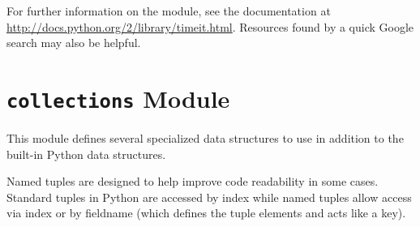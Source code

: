For further information on the  module, see the documentation at \url{http://docs.python.org/2/library/timeit.html}. Resources found by a quick Google search may also be helpful.

\begin{comment}
\begin{problem}
For most timing situations, we rely on IPython's \li{\%timeit} function.
Since this is a special function only available inside IPython, however, we will write a more general timer that works anywhere with any function.
The solution to this problem will be useful in other labs where you will be asked to time the execution of your coded solutions.
Write a function that will time the execution of another function.
Your function should return the minimum runtime for one call of the function.

Because of the way that Python's \li{timeit} module works, we can either evaluate a string of Python code or use a \emph{callable} function with no arguments.
For this problem, we will use the the callable function approach.
This essentially means we have to wrap the function we are timing and all of its arguments into a function object that can be called by \li{timeit}.
This wrapping fixes the arguments of the function so we can call it without any arguments later.
This is done by declaring a Python \li{lambda}, or temporary, anonymous  function, which takes no arguments.  \li{pfunc} is a wrapper function for $f$ because its primary job is to call $f$ with little or no additional computation.
In our program, we use \li{pfunc} only to modify how we call $f$.
\begin{lstlisting}
pfunc = lambda: f(*args, **kwargs)
\end{lstlisting}
where \li{args} is a tuple of arguments and \li{kwargs} is a dictionary of keyword arguments to the function, $f$.
You can refresh your memory of functions and their arguments and keyword arguments in sections 4.7.1-4.7.4 of the official Python tutorial.
\end{problem}
\end{comment}


\section*{\texttt{collections} Module}
This module defines several specialized data structures to use in addition to the built-in Python data structures.

Named tuples are designed to help improve code readability in some cases.
Standard tuples in Python are accessed by index while named tuples allow access via index or by  fieldname (which defines the tuple elements and acts like a key).

